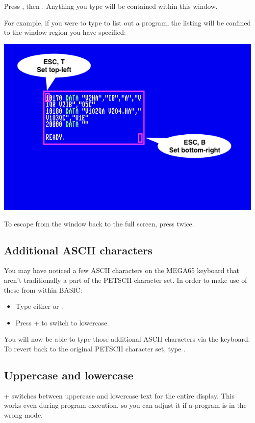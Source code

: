 Press , then . Anything you type will be contained within this window.

For example, if you were to type  to list out a program, the listing will be confined to the window region you have specified:

\begin{center}
\includegraphics[width=0.7\linewidth]{images/set-window.png}
\end{center}

To escape from the window back to the full screen, press  twice.

\subsection{Additional ASCII characters}

You may have noticed a few ASCII characters on the MEGA65 keyboard that aren't traditionally a part of the PETSCII character set. In order to make use of these from within BASIC:

\begin{itemize}
  \item Type either  or .
  \item Press \megasymbolkey +  to switch to lowercase.
\end{itemize}

You will now be able to type those additional ASCII characters via the keyboard. To revert back to the original PETSCII character set, type .

\subsection{Uppercase and lowercase}

\megasymbolkey +  switches between uppercase and lowercase text for the entire display. This works even during program execution, so you can adjust it if a program is in the wrong mode.


